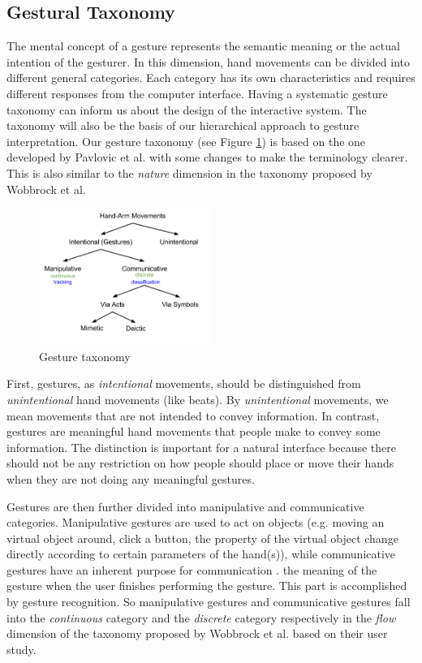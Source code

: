\subsection{Gestural Taxonomy}\label{sec:taxonomy}
The mental concept of a gesture represents the semantic meaning or the
actual intention of the gesturer. In this dimension, hand movements can be
divided into different general categories. Each category has its own characteristics and requires different responses from the computer interface. Having a systematic gesture taxonomy can inform
us about the design of the interactive system. The taxonomy will also be the
basis of our hierarchical approach to gesture interpretation. Our gesture
taxonomy (see Figure \ref{fig:taxonomy}) is based on the one developed by Pavlovic et al.
\cite{Pavlovic97} with some changes to make the terminology clearer. This is
also similar to the \textit{nature} dimension in the taxonomy proposed by
Wobbrock et al. \cite{wobbrock09}

\begin{figure}[h]
  \centering
  \includegraphics[width=0.5\textwidth]{figures/taxonomy.png} 
  \caption{Gesture taxonomy}
  \label{fig:taxonomy}
\end{figure}

First, gestures, as \textit{intentional} movements, should be distinguished from
\textit{unintentional} hand movements (like beats). By \textit{unintentional}
movements, we mean movements that are not intended to convey information. In
contrast, gestures are meaningful hand movements that people make to convey some
information. The distinction is important for a natural interface because there
should not be any restriction on how people should place or move their hands
when they are not doing any meaningful gestures. 

Gestures are then further divided into manipulative and communicative
categories. Manipulative gestures are used to act on objects (e.g.
moving an virtual object around, click a button, the property of the virtual
object change directly according to certain parameters of the hand(s)), while
communicative gestures have an inherent purpose for communication \cite{Pavlovic97}. 
the meaning of the gesture when the user finishes performing the gesture. This part is
accomplished by gesture recognition. So manipulative gestures and communicative
gestures fall into the \textit{continuous} category and the
\textit{discrete} category respectively in the \textit{flow} dimension of the
taxonomy proposed by Wobbrock \cite{wobbrock09} et al. based on their
user study.


